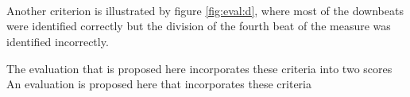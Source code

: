 \begin{figure}
\centering
{}
\\
\\
\\
\end{figure}

Another criterion is illustrated by figure \ref{fig:eval:d}, where most of the downbeats were identified correctly but the division of the fourth beat of the measure was identified incorrectly. 

The evaluation that is proposed here incorporates these criteria into two scores
An evaluation is proposed here that incorporates these criteria 
